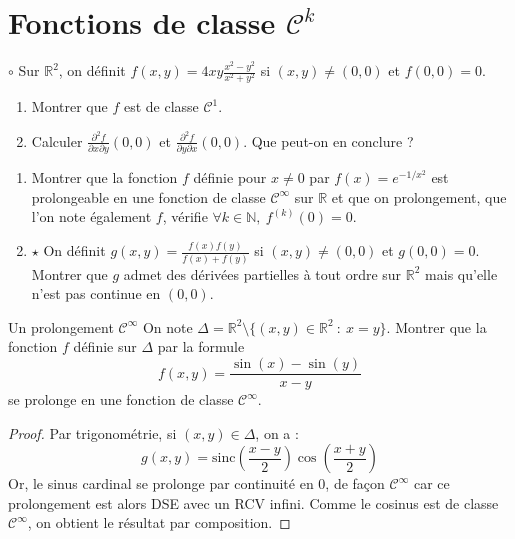 \documentclass[french,a4paper]{article}
\newcommand{\N}{\mathbb{N}}
\newcommand{\R}{\mathbb{R}}
\theoremstyle{plain}
\theoremstyle{definition}
\theoremstyle{remark}
\begin{document}
\section{Fonctions de classe $\mathcal{C}^k$}

\begin{ex}[Moulin.CD.22]{$\circ$}
	Sur $\R^2$, on définit $f(x,y)=\displaystyle4xy\frac{x^2-y^2}{x^2+y^2}$ si $(x,y)\ne(0,0)$ et $f(0,0)=0$.
	\begin{enumerate}
		\item Montrer que $f$ est de classe $\mathcal{C}^1$.
		\item Calculer $\displaystyle\frac{\partial^2 f}{\partial x\partial y}(0,0)$ et $\displaystyle\frac{\partial^2 f}{\partial y\partial x}(0,0)$. Que peut-on en conclure ?
	\end{enumerate}
\end{ex}

\begin{ex}[Moulin.CD.23]{}
	\begin{enumerate}
		\item Montrer que la fonction $f$ définie pour $x\ne 0$ par $f(x)=e^{-1/x^2}$ est prolongeable en une fonction de classe $\mathcal{C}^\infty$ sur $\R$ et que on prolongement, que l'on note également $f$, vérifie $\forall k\in\N,\ f^{(k)}(0)=0$.
		\item $\star$ On définit $g(x,y)=\displaystyle\frac{f(x)f(y)}{f(x)+f(y)}$ si $(x,y)\ne(0,0)$ et $g(0,0)=0$. \\ Montrer que $g$ admet des dérivées partielles à tout ordre sur $\R^2$ mais qu'elle n'est pas continue en $(0,0)$.
	\end{enumerate}
\end{ex}

\begin{ex}[Moulin.CD.24]{Un prolongement $\mathcal{C}^\infty$}
	On note $\Delta=\R^2\setminus\{(x,y)\in\R^2\ : \ x=y\}$. Montrer que la fonction $f$ définie sur $\Delta$ par la formule $$f(x,y)=\frac{\sin(x)-\sin(y)}{x-y}$$ se prolonge en une fonction de classe $\mathcal{C}^\infty$.
\end{ex}
\begin{proof}
	Par trigonométrie, si $(x,y)\in\Delta$, on a : $$g(x,y)=\text{sinc}\left(\frac{x-y}{2}\right)\cos\left(\frac{x+y}{2}\right)$$ Or, le sinus cardinal se prolonge par continuité en $0$, de façon $\mathcal{C}^\infty$ car ce prolongement est alors DSE avec un RCV infini. Comme le cosinus est de classe $\mathcal{C}^\infty$, on obtient le résultat par composition.
\end{proof}
\end{document}
